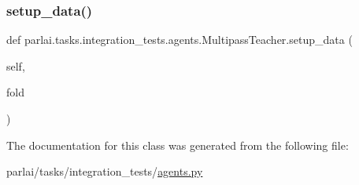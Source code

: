 \subsubsection{\texorpdfstring{setup\+\_\+data()}{setup\_data()}}
{\footnotesize\ttfamily def parlai.\+tasks.\+integration\+\_\+tests.\+agents.\+Multipass\+Teacher.\+setup\+\_\+data (\begin{DoxyParamCaption}\item[{}]{self,  }\item[{}]{fold }\end{DoxyParamCaption})}



The documentation for this class was generated from the following file\+:\begin{DoxyCompactItemize}
\item 
parlai/tasks/integration\+\_\+tests/\hyperlink{parlai_2tasks_2integration__tests_2agents_8py}{agents.\+py}\end{DoxyCompactItemize}
